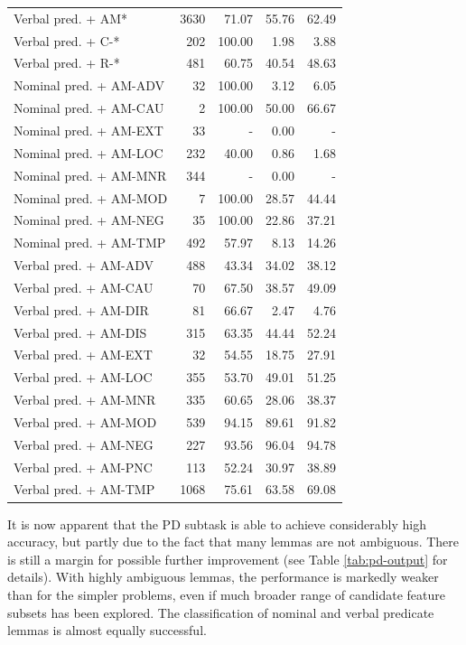 \documentclass[12pt,notitlepage]{report}
\begin{document}
\begin{table}[p]
\begin{center}
\begin{tabular}{|l|r|r|r|r|}
Verbal pred. + AM* & 3630 & 71.07 & 55.76 & 62.49 \\
Verbal pred. + C-* & 202 & 100.00 & 1.98 & 3.88 \\
Verbal pred. + R-* & 481 & 60.75 & 40.54 & 48.63 \\\hline\hline
Nominal pred. + AM-ADV & 32 & 100.00 & 3.12 & 6.05 \\
Nominal pred. + AM-CAU & 2 & 100.00 & 50.00 & 66.67 \\
Nominal pred. + AM-EXT & 33 & - & 0.00 & - \\
Nominal pred. + AM-LOC & 232 & 40.00 & 0.86 & 1.68 \\
Nominal pred. + AM-MNR & 344 & - & 0.00 & - \\
Nominal pred. + AM-MOD & 7 & 100.00 & 28.57 & 44.44 \\
Nominal pred. + AM-NEG & 35 & 100.00 & 22.86 & 37.21 \\
Nominal pred. + AM-TMP & 492 & 57.97 & 8.13 & 14.26 \\\hline
Verbal pred. + AM-ADV & 488 & 43.34 & 34.02 & 38.12 \\
Verbal pred. + AM-CAU & 70 & 67.50 & 38.57 & 49.09 \\
Verbal pred. + AM-DIR & 81 & 66.67 & 2.47 & 4.76 \\
Verbal pred. + AM-DIS & 315 & 63.35 & 44.44 & 52.24 \\
Verbal pred. + AM-EXT & 32 & 54.55 & 18.75 & 27.91 \\
Verbal pred. + AM-LOC & 355 & 53.70 & 49.01 & 51.25 \\
Verbal pred. + AM-MNR & 335 & 60.65 & 28.06 & 38.37 \\
Verbal pred. + AM-MOD & 539 & 94.15 & 89.61 & 91.82 \\
Verbal pred. + AM-NEG & 227 & 93.56 & 96.04 & 94.78 \\
Verbal pred. + AM-PNC & 113 & 52.24 & 30.97 & 38.89 \\
Verbal pred. + AM-TMP & 1068 & 75.61 & 63.58 & 69.08 \\\hline
\end{tabular}
\end{center}
\end{table}

It is now apparent that the PD subtask is able to achieve considerably high accuracy, but partly due to the fact that many lemmas are not ambiguous. There is still a margin for possible further improvement (see Table \ref{tab:pd-output} for details). With highly ambiguous lemmas, the performance is markedly weaker than for the simpler problems, even if much broader range of candidate feature subsets has been explored. The classification of nominal and verbal predicate lemmas is almost equally successful.
\end{document}
